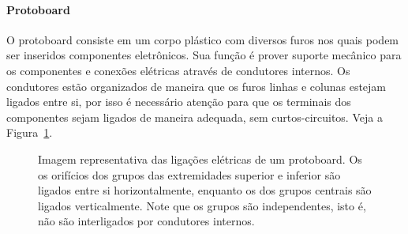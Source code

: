 \paragraph{Protoboard}

O protoboard consiste em um corpo plástico com diversos furos nos quais podem ser inseridos componentes eletrônicos. Sua função é prover suporte mecânico para os componentes e conexões elétricas através de condutores internos. Os condutores estão organizados de maneira que os furos linhas e colunas estejam ligados entre si, por isso é necessário atenção para que os terminais dos componentes sejam ligados de maneira adequada, sem curtos-circuitos. Veja a Figura~\ref{Fig:Protoboard}.

\begin{figure}
    \centering
    \caption{Imagem representativa das ligações elétricas de um protoboard. Os os orifícios dos grupos das extremidades superior e inferior são ligados entre si horizontalmente, enquanto os dos grupos centrais são ligados verticalmente. Note que os grupos são independentes, isto é, não são interligados por condutores internos.\label{Fig:Protoboard}}
\end{figure}

